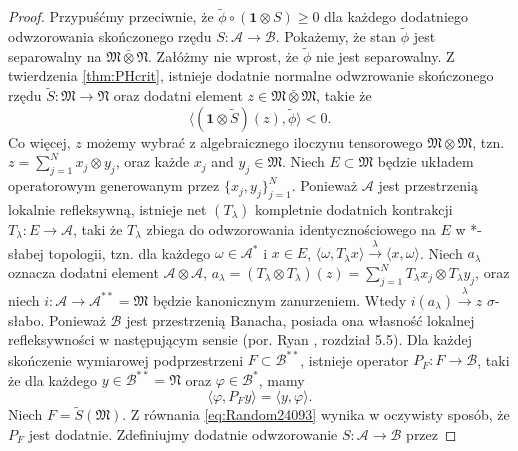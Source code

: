 \begin{proof}
Przypuśćmy przeciwnie, że $\tilde{\phi} \circ (\mathbf{1} \otimes S) \geq 0$
dla każdego dodatniego odwzorowania skończonego rzędu
$S: \mathcal{A} \rightarrow \mathcal{B}$.
Pokażemy, że stan $\tilde{\phi}$
jest separowalny na $\mathfrak{M} \bar{\otimes} \mathfrak{N}$.
Załóżmy nie wprost, że $\tilde{\phi}$ nie jest separowalny.
Z twierdzenia \ref{thm:PHcrit},
istnieje dodatnie normalne odwzrowanie skończonego rzędu
$\tilde{S}: \mathfrak{M} \rightarrow \mathfrak{N}$
oraz dodatni element $z \in \mathfrak{M} \bar{\otimes} \mathfrak{M}$,
takie że
\begin{equation}
\label{eq:Random6347}
\langle(\mathbf{1} \otimes \tilde{S})(z), \tilde{\phi}\rangle < 0.
\end{equation}
Co więcej, $z$ możemy wybrać z algebraicznego iloczynu tensorowego
$\mathfrak{M} \otimes \mathfrak{M}$,
tzn. $z = \sum_{j=1}^{N} x_{j} \otimes y_{j}$,
oraz każde $x_{j}$ and $y_{j} \in \mathfrak{M}$.
Niech $E \subset \mathfrak{M}$ będzie układem operatorowym generowanym przez
$\{ x_{j}, y_{j}\}_{j=1}^{N}$.
Ponieważ $\mathcal{A}$ jest przestrzenią lokalnie refleksywną,
istnieje net $(T_{\lambda})$ kompletnie dodatnich kontrakcji
$T_{\lambda}: E \rightarrow \mathcal{A}$,
taki że $T_{\lambda}$ zbiega do odwzorowania identycznościowego na $E$
w *-słabej topologii, tzn.
dla każdego $\omega \in \mathcal{A}^{*}$ i $x \in E$,
$ \langle \omega, T_{\lambda}x \rangle\stackrel{\lambda}{\rightarrow}
\langle x, \omega \rangle$.
Niech $a_{\lambda}$ oznacza dodatni element $\mathcal{A} \otimes \mathcal{A}$,
$a_{\lambda} = (T_{\lambda} \otimes T_{\lambda}) (z) =
\sum_{j=1}^{N} T_{\lambda} x_{j} \otimes T_{\lambda} y_{j}$,
oraz niech
$i: \mathcal{A} \rightarrow \mathcal{A}^{**}=\mathfrak{M}$
będzie kanonicznym zanurzeniem.
Wtedy $i(a_{\lambda}) \stackrel{\lambda}{\rightarrow} z$
$\sigma$-słabo.
Ponieważ $\mathcal{B}$ jest przestrzenią Banacha,
posiada ona własność lokalnej refleksywności w następującym sensie
(por. Ryan \cite{Ryan2002}, rozdział 5.5).
Dla każdej skończenie wymiarowej podprzestrzeni $F \subset \mathcal{B}^{**}$,
istnieje operator $P_{F}: F \rightarrow \mathcal{B}$,
taki że dla każdego $y \in \mathcal{B}^{**} = \mathfrak{N}$
oraz $\varphi \in \mathcal{B}^{*}$, mamy
\begin{equation}
\label{eq:Random24093}
\langle \varphi, P_{F}y \rangle =\langle y, \varphi \rangle.
\end{equation}
Niech $F = \tilde{S}(\mathfrak{M})$.
Z równania \eqref{eq:Random24093} wynika w oczywisty sposób, że
$P_{F}$ jest dodatnie.
Zdefiniujmy dodatnie odwzorowanie $S: \mathcal{A} \rightarrow \mathcal{B}$ przez

\end{proof}
